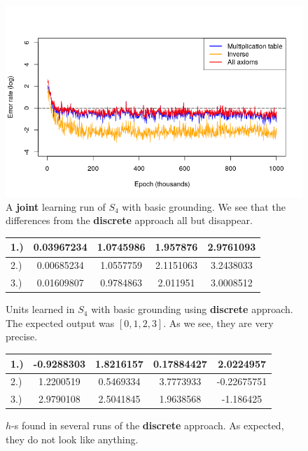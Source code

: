 \begin{figure}
\caption{A \textbf{joint} learning run of $S_4$ with basic grounding. We see that the differences from the \textbf{discrete} approach all but disappear.}
\includegraphics[width=\linewidth]{../img/s4_joint.png}
\end{figure}

\begin{figure}
\center
\caption{Units learned in $S_4$ with basic grounding using \textbf{discrete} approach. The expected output was $[0,1,2,3]$. As we see, they are very precise.}
\label{table:s4_unit_basic}
\begin{tabular}{l|cccc}
1.) &0.03967234 & 1.0745986 & 1.957876 & 2.9761093\\
\hline
2.) &0.00685234 & 1.0557759 & 2.1151063 & 3.2438033\\
\hline
3.) &0.01609807 & 0.9784863 & 2.011951 & 3.0008512\\
\end{tabular}
\end{figure}

\begin{figure}
\center
\caption{$h$-s found in several runs of the \textbf{discrete} approach. As expected, they do not look like anything.}
\label{table:s4_half_basic}
\begin{tabular}{l|cccc}
1.)&-0.9288303 & 1.8216157 & 0.17884427 & 2.0224957\\
\hline
2.)&1.2200519 & 0.5469334 & 3.7773933 & -0.22675751\\
 \hline
3.)&2.9790108 & 2.5041845 & 1.9638568 & -1.186425\\
\end{tabular}
\end{figure}

